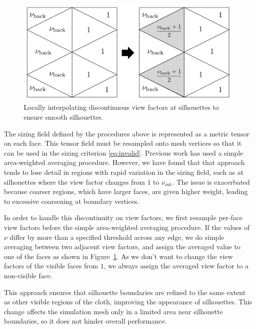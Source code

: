 \documentclass[10pt,journal,compsoc,twoside]{TexInputs/IEEEtran}
\newcommand{\rahul}[1]{\textcolor{blue}{(#1 ---Rahul)}}
\begin{document}
\begin{figure}[t]
    \centering
    \includegraphics[width=0.8\columnwidth]{silhouette_preserving}
    \caption{Locally interpolating discontinuous view factors at silhouettes to ensure smooth silhouettes.}
    \label{fig:silhouette_preserving}
\end{figure}

The sizing field defined by the procedures above is represented as a metric tensor on each face.
This tensor field must be resampled onto mesh vertices so that it can be used in the sizing criterion
\eqref{eq:invalid}.  Previous work \cite{Narain:2012:AAR} has used a simple area-weighted
averaging procedure. However, we have found that that approach tends to lose detail in
regions with rapid variation in the sizing field, such as at silhouettes where the view
factor changes from $1$ to $\nu_{\text{out}}$. The issue is exacerbated because coarser
regions, which have larger faces, are given higher weight, leading to excessive coarsening
at boundary vertices.

In order to handle this discontinuity on view factors, we first resample per-face view
factors before the simple area-weighted averaging procedure. If the values of $\nu$ differ by more than a specified threshold across any edge, we do simple
averaging between two adjacent view factors, and assign the averaged value to one
of the faces as shown in Figure~\ref{fig:silhouette_preserving}. As we don't want to
change the view factors of the visible faces from $1$, we always assign the
averaged view factor to a non-visible face.

This approach ensures that silhouette boundaries are refined to the same extent
as other visible regions of the cloth, improving the appearance of silhouettes.
This change affects the simulation mesh only in a limited area near silhouette
boundaries, so it does not hinder overall performance.
\end{document}
